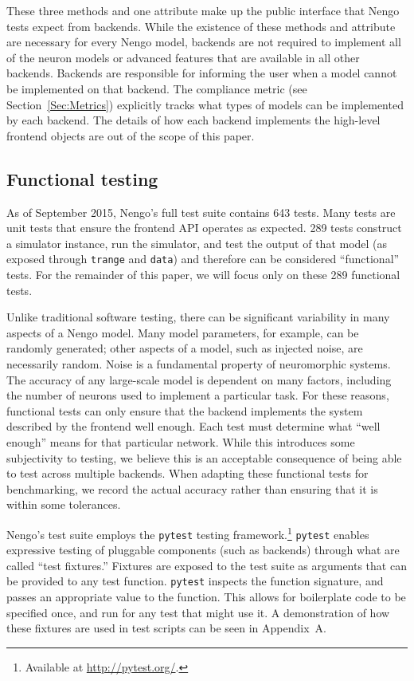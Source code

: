 \documentclass{frontiersSCNS}
\begin{document}
These three methods and one attribute
make up the public interface
that Nengo tests expect from backends.
While the existence of these methods
and attribute are necessary
for every Nengo model,
backends are not required
to implement all of the neuron models
or advanced features that
are available in all other backends.
Backends are responsible for informing
the user when a model cannot be implemented
on that backend.
The compliance metric (see Section~\ref{Sec:Metrics})
explicitly tracks what
types of models can be implemented
by each backend.
The details of how each backend
implements the high-level frontend objects
are out of the scope of this paper.

\subsection{Functional testing}

As of September 2015, Nengo's full test suite contains 643 tests.
Many tests are unit tests
that ensure the frontend API operates as expected.
289 tests construct a simulator instance,
run the simulator, and test the output of that model
(as exposed through \texttt{trange}
and \texttt{data})
and therefore can be considered ``functional'' tests.
For the remainder of this paper,
we will focus only on these 289 functional tests.

Unlike traditional software testing,
there can be significant variability
in many aspects of a Nengo model.
Many model parameters, for example,
can be randomly generated;
other aspects of a model,
such as injected noise,
are necessarily random.
Noise is a fundamental property
of neuromorphic systems.
The accuracy of any large-scale model
is dependent on many factors,
including the number of neurons used
to implement a particular task.
For these reasons,
functional tests can only
ensure that the backend implements
the system described by the frontend
well enough.
Each test must determine what
``well enough'' means for that particular network.
While this introduces some subjectivity
to testing,
we believe this is an acceptable consequence
of being able to test across multiple backends.
When adapting these functional tests for benchmarking,
we record the actual accuracy rather than
ensuring that it is within some tolerances.

Nengo's test suite employs the \texttt{pytest}
testing framework.\footnote{Available at \url{http://pytest.org/}.}
\texttt{pytest} enables
expressive testing of pluggable components
(such as backends)
through what are called ``test fixtures.''
Fixtures are exposed to the test suite
as arguments that can be provided
to any test function.
\texttt{pytest} inspects the function signature,
and passes an appropriate value
to the function.
This allows for boilerplate code
to be specified once,
and run for any test that might use it.
A demonstration of how these fixtures
are used in test scripts
can be seen in Appendix~A.
\end{document}
